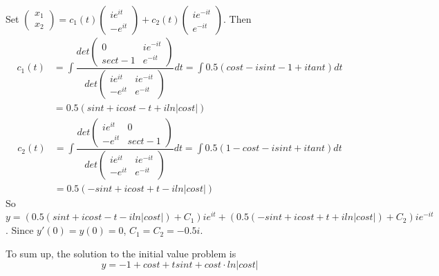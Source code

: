\documentclass[a4paper,12pt,titlepage]{article}
\begin{document}
Set $\begin{pmatrix}
x_1\\
x_2
\end{pmatrix}=c_1(t)\begin{pmatrix}
ie^{it}\\
-e^{it}
\end{pmatrix}+c_2(t)\begin{pmatrix}
ie^{-it}\\
e^{-it}
\end{pmatrix}$. Then 
\begin{align*}
c_1(t)&=\int\dfrac{det\begin{pmatrix}
0&ie^{-it}\\
sect-1&e^{-it}
\end{pmatrix}}{det\begin{pmatrix}
ie^{it}&ie^{-it}\\
-e^{it}&e^{-it}
\end{pmatrix}}dt=\int 0.5(cost-isint-1+itant)dt\\
&=0.5(sint+icost-t+iln|cost|)
\end{align*}
\begin{align*}
c_2(t)&=\int\dfrac{det\begin{pmatrix}
ie^{it}&0\\
-e^{it}&sect-1
\end{pmatrix}}{det\begin{pmatrix}
ie^{it}&ie^{-it}\\
-e^{it}&e^{-it}
\end{pmatrix}}dt=\int 0.5(1-cost-isint+itant)dt\\
&=0.5(-sint+icost+t-iln|cost|)
\end{align*}
So $y=(0.5(sint+icost-t-iln|cost|)+C_1)ie^{it}+(0.5(-sint+icost+t+iln|cost|)+C_2)ie^{-it}$. Since $y'(0)=y(0)=0$, $C_1=C_2=-0.5i$.

To sum up, the solution to the initial value problem is $$y=-1+cost+tsint +cost\cdot ln|cost|$$
\end{document}
